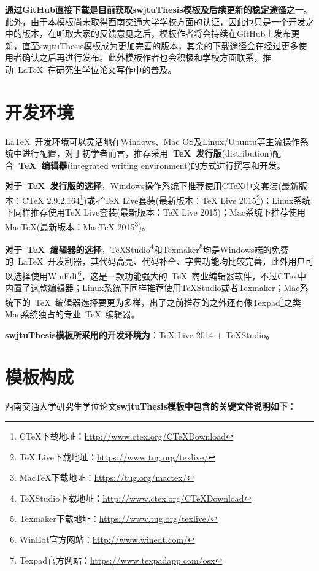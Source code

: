 \par
\textbf{通过GitHub直接下载是目前获取swjtuThesis模板及后续更新的稳定途径之一}。此外，由于本模板尚未取得西南交通大学学校方面的认证，因此也只是一个开发之中的版本，在听取大家的反馈意见之后，模板作者将会持续在GitHub上发布更新，直至swjtuThesis模板成为更加完善的版本，其余的下载途径会在经过更多使用者确认之后再进行发布。此外模板作者也会积极和学校方面联系，推动~\LaTeX{}~在研究生学位论文写作中的普及。

\section{开发环境}

\LaTeX{}~开发环境可以灵活地在Windows、Mac OS及Linux/Ubuntu等主流操作系统中进行配置，对于初学者而言，推荐采用\textbf{~\TeX~发行版}(distribution)配合\textbf{~\TeX~编辑器}(integrated writing environment)的方式进行撰写和开发。

\par
\textbf{对于~\TeX~发行版的选择}，Windows操作系统下推荐使用CTeX中文套装(最新版本：CTeX 2.9.2.164\footnote{CTeX下载地址：\url{http://www.ctex.org/CTeXDownload}})或者TeX Live套装(最新版本：TeX Live 2015\footnote{TeX Live下载地址：\url{https://www.tug.org/texlive/}})；Linux系统下同样推荐使用TeX Live套装(最新版本：TeX Live 2015)；Mac系统下推荐使用MacTeX(最新版本：MacTeX-2015\footnote{MacTeX下载地址：\url{https://tug.org/mactex/}})。

\par
\textbf{对于~\TeX~编辑器的选择}，TeXStudio\footnote{TeXStudio下载地址：\url{http://www.ctex.org/CTeXDownload}}和Texmaker\footnote{Texmaker下载地址：\url{https://www.tug.org/texlive/}}均是Windows端的免费的~\LaTeX{}~开发利器，其代码高亮、代码补全、字典功能均比较完善，此外用户可以选择使用WinEdt\footnote{WinEdt官方网站：\url{http://www.winedt.com/}}，这是一款功能强大的~\TeX~商业编辑器软件，不过CTex中内置了这款编辑器；Linux系统下同样推荐使用TeXStudio或者Texmaker；Mac系统下的~\TeX~编辑器选择要更为多样，出了之前推荐的之外还有像Texpad\footnote{Texpad官方网站：\url{https://www.texpadapp.com/osx}}之类Mac系统独占的专业~\TeX~编辑器。

\par
\textbf{swjtuThesis模板所采用的开发环境为}：TeX Live 2014 + TeXStudio。

\section{模板构成}

西南交通大学研究生学位论文\textbf{swjtuThesis模板中包含的关键文件说明如下}：

